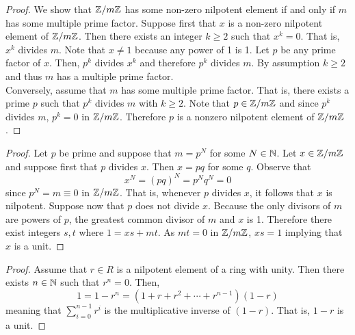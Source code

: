 \documentclass[../AlgebraQualSolutions.tex]{subfiles}
\begin{document}
\begin{proof}
    We show that $\mathbb{Z}/m\mathbb{Z}$ has some non-zero nilpotent element if and only if $m$ has some multiple prime factor. Suppose first that $x$ is a non-zero nilpotent element of $\mathbb{Z}/m\mathbb{Z}$. Then there exists an integer $k \geq 2$ such that $x^k = 0$. That is, $x^k$ divides $m$. Note that $x \neq 1$ because any power of 1 is 1. Let $p$ be any prime factor of $x$. Then, $p^k$ divides $x^k$ and therefore $p^k$ divides $m$. By assumption $k \geq 2$ and thus $m$ has a multiple prime factor.\\

    Conversely, assume that $m$ has some multiple prime factor. That is, there exists a prime $p$ such that $p^k$ divides $m$ with $k \geq 2$. Note that $p \in \mathbb{Z}/m\mathbb{Z}$ and since $p^k$ divides $m$, $p^k = 0$ in $\mathbb{Z}/m\mathbb{Z}$. Therefore $p$ is a nonzero nilpotent element of $\mathbb{Z}/m\mathbb{Z}$.
\end{proof}

\begin{proof}
    Let $p$ be prime and suppose that $m = p^N$ for some $N \in \mathbb{N}$. Let $x \in \mathbb{Z}/m\mathbb{Z}$ and suppose first that $p$ divides $x$. Then $x = pq$ for some $q$. Observe that
        \[x^N = (pq)^N = p^Nq^N = 0\]
    since $p^N = m \equiv 0$ in $\mathbb{Z}/m\mathbb{Z}$. That is, whenever $p$ divides $x$, it follows that $x$ is nilpotent. Suppose now that $p$ does not divide $x$. Because the only divisors of $m$ are powers of $p$, the greatest common divisor of $m$ and $x$ is 1. Therefore there exist integers $s,t$ where $1 = xs + mt$. As $mt = 0$ in $\mathbb{Z}/m\mathbb{Z}$, $xs = 1$ implying that $x$ is a unit.
\end{proof}

\begin{proof}
    Assume that $r \in R$ is a nilpotent element of a ring with unity. Then there exists $n \in \mathbb{N}$ such that $r^n = 0$. Then,
        \[1 = 1 - r^n = (1 + r + r^2 + \cdots + r^{n-1})(1-r)\]
    meaning that $\sum_{i=0}^{n-1}r^i$ is the multiplicative inverse of $(1-r)$. That is, $1-r$ is a unit.
\end{proof}
\end{document}
